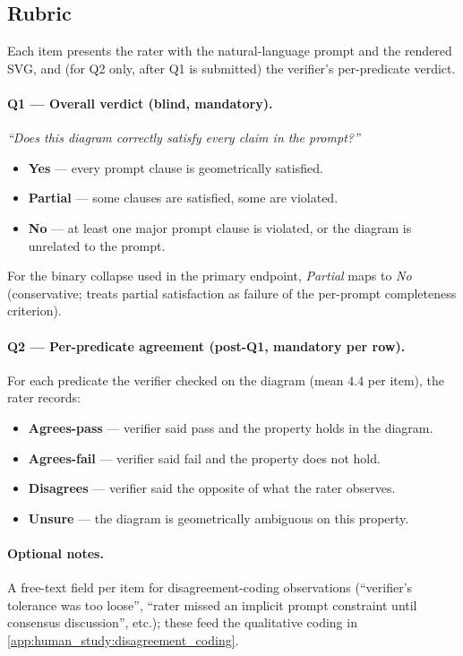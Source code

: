 \subsection{Rubric}
\label{app:human_study:rubric}

Each item presents the rater with the natural-language prompt and the rendered SVG, and (for Q2 only, after Q1 is submitted) the verifier's per-predicate verdict.

\paragraph{Q1 --- Overall verdict (blind, mandatory).}
\textit{``Does this diagram correctly satisfy every claim in the prompt?''}
\begin{itemize}
\item \textbf{Yes} --- every prompt clause is geometrically satisfied.
\item \textbf{Partial} --- some clauses are satisfied, some are violated.
\item \textbf{No} --- at least one major prompt clause is violated, or the diagram is unrelated to the prompt.
\end{itemize}
For the binary collapse used in the primary endpoint, \emph{Partial} maps to \emph{No} (conservative; treats partial satisfaction as failure of the per-prompt completeness criterion).

\paragraph{Q2 --- Per-predicate agreement (post-Q1, mandatory per row).}
For each predicate the verifier checked on the diagram (mean $4.4$ per item), the rater records:
\begin{itemize}
\item \textbf{Agrees-pass} --- verifier said pass and the property holds in the diagram.
\item \textbf{Agrees-fail} --- verifier said fail and the property does not hold.
\item \textbf{Disagrees} --- verifier said the opposite of what the rater observes.
\item \textbf{Unsure} --- the diagram is geometrically ambiguous on this property.
\end{itemize}

\paragraph{Optional notes.} A free-text field per item for disagreement-coding observations (``verifier's tolerance was too loose'', ``rater missed an implicit prompt constraint until consensus discussion'', etc.); these feed the qualitative coding in \cref{app:human_study:disagreement_coding}.

